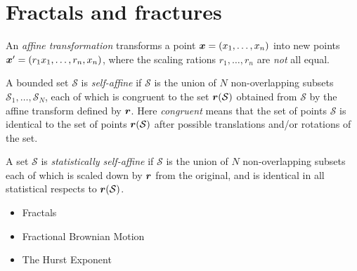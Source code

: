 




\chapter{Fractals and fractures}

An \emph{affine transformation} transforms a point $\boldsymbol{x} = (x_1, \dots, x_n)$ into new points $\boldsymbol{x}' = (r_1x_1, \dots, r_n, x_n)$, where the scaling rations $r_1, \dots, r_n$ are \emph{not} all equal.

A bounded set $\mathcal{S}$ is \emph{self-affine} if $\mathcal{S}$ is the union of $N$ non-overlapping subsets $\mathcal{S}_1, \dots, \mathcal{S}_N$, each of which is congruent to the set $\boldsymbol{r}(\mathcal{S})$ obtained from $\mathcal S$ by the affine transform defined by $\boldsymbol{r}$. Here \emph{congruent} means that the set of points $\mathcal{S}$ is identical to the set of points $\boldsymbol{r}(\mathcal{S})$ after possible translations and/or rotations of the set\cite{feder1988fractals}.

A set $\mathcal{S}$ is \emph{statistically self-affine} if $\mathcal{S}$ is the union of $N$ non-overlapping subsets each of which is scaled down by $\boldsymbol{r}$ from the original, and is identical in all statistical respects to $\boldsymbol{r}(\mathcal{S})$.

\begin{itemize}
    \item Fractals
    \item Fractional Brownian Motion
    \item The Hurst Exponent
\end{itemize}
